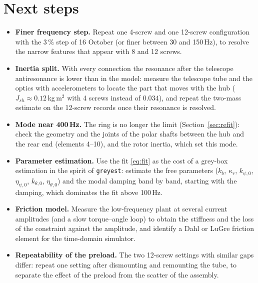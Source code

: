 \documentclass[10pt,a4paper]{article}
\numberwithin{equation}{section}
\begin{document}
\section{Next steps}\label{sec:next}
\begin{itemize}
\item \textbf{Finer frequency step.} Repeat one 4-screw and one 12-screw configuration with the 3\,\% step of 16 October (or finer between 30 and 150\,Hz), to resolve the narrow features that appear with 8 and 12 screws.
\item \textbf{Inertia split.} With every connection the resonance after the telescope antiresonance is lower than in the model: measure the telescope tube and the optics with accelerometers to locate the part that moves with the hub ($J_{sh} \approx 0.12$\,kg\,m$^2$ with 4 screws instead of $0.034$), and repeat the two-mass estimate on the 12-screw records once their resonance is resolved.
\item \textbf{Mode near 400\,Hz.} The ring is no longer the limit (Section~\ref{sec:refit}): check the geometry and the joints of the polar shafts between the hub and the rear end (elements 4--10), and the rotor inertia, which set this mode.
\item \textbf{Parameter estimation.} Use the fit \eqref{eq:fit} as the cost of a grey-box estimation in the spirit of \texttt{greyest}: estimate the free parameters ($k_b$, $\kappa_r$, $k_{\psi,0}$, $\eta_{\psi,0}$, $k_{\theta,0}$, $\eta_{\theta,0}$) and the modal damping band by band, starting with the damping, which dominates the fit above 100\,Hz.
\item \textbf{Friction model.} Measure the low-frequency plant at several current amplitudes (and a slow torque--angle loop) to obtain the stiffness and the loss of the constraint against the amplitude, and identify a Dahl or LuGre friction element for the time-domain simulator.
\item \textbf{Repeatability of the preload.} The two 12-screw settings with similar gaps differ: repeat one setting after dismounting and remounting the tube, to separate the effect of the preload from the scatter of the assembly.
\end{itemize}
\end{document}
